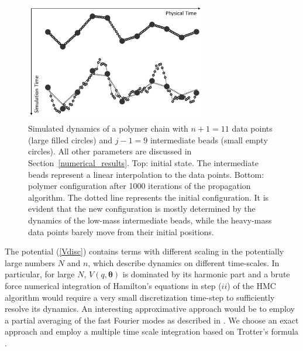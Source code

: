 \documentclass[12pt,a4paper,final]{iopart}
\newcommand{\bt}{\pmb\theta}
\begin{document}

\begin{figure}[htb!]
    \centering
    \captionsetup{justification=justified}
    \includegraphics[width=0.7\textwidth]{Figs/FigPolymer.png}
    \caption{Simulated dynamics of a polymer chain with $n+1=11$ data points (large filled circles) and $j-1=9$ intermediate beads (small empty circles). All other parameters are discussed in Section~\ref{numerical_results}. Top: initial state. The intermediate beads represent a linear interpolation to the data points. Bottom: polymer configuration after 1000 iterations of the propagation algorithm. The dotted line represents the initial configuration. It is evident that the new configuration is mostly determined by the dynamics of the low-mass intermediate beads, while the heavy-mass data points barely move from their initial positions.}
    \label{fig:polymer}
\end{figure}

The potential (\ref{Vdisc}) contains terms with different scaling in the potentially large numbers $N$ and $n$, which describe dynamics on different time-scales.
In particular, for large $N$, $V(q,\bt)$ is dominated by its harmonic part and a brute force numerical integration of Hamilton's equations in step ($ii$) of the HMC algorithm would require a very small discretization time-step to sufficiently resolve its dynamics.
An interesting approximative approach would be to employ a partial averaging of the fast Fourier modes as described in \cite{doll_1985_fourier}.
We choose an exact approach and employ a multiple time scale integration based on Trotter's formula \cite{tuckerman_1993}.
\end{document}
